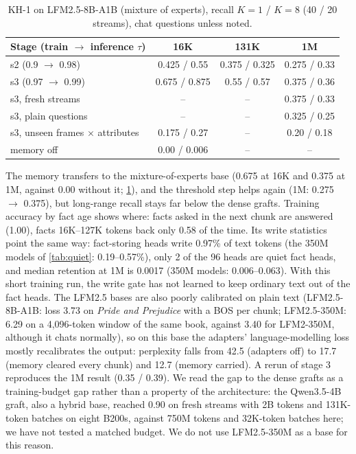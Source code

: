 \documentclass[11pt]{article}
\newcommand{\tauw}{\tau}
\newcommand{\KH}{KH-1}
\begin{document}
\begin{table}[t]
\centering
\small
\caption{\KH{} on LFM2.5-8B-A1B (mixture of experts), recall $K = 1$ / $K = 8$ (40 / 20 streams), chat questions unless noted.}
\label{tab:lfm25}
\begin{tabular}{@{}lccc@{}}
\toprule
Stage (train $\to$ inference $\tauw$) & 16K & 131K & 1M \\
\midrule
s2 (0.9 $\to$ 0.98) & 0.425 / 0.55 & 0.375 / 0.325 & 0.275 / 0.33 \\
s3 (0.97 $\to$ 0.99) & 0.675 / 0.875 & 0.55 / 0.57 & 0.375 / 0.36 \\
s3, fresh streams & -- & -- & 0.375 / 0.33 \\
s3, plain questions & -- & -- & 0.325 / 0.25 \\
s3, unseen frames $\times$ attributes & 0.175 / 0.27 & -- & 0.20 / 0.18 \\
memory off & 0.00 / 0.006 & -- & -- \\
\bottomrule
\end{tabular}
\end{table}

The memory transfers to the mixture-of-experts base (0.675 at 16K and 0.375 at 1M, against 0.00 without it; \cref{tab:lfm25}), and the threshold step helps again (1M: 0.275 $\to$ 0.375), but long-range recall stays far below the dense grafts. Training accuracy by fact age shows where: facts asked in the next chunk are answered (1.00), facts 16K--127K tokens back only 0.58 of the time. Its write statistics point the same way: fact-storing heads write 0.97\% of text tokens (the 350M models of \cref{tab:quiet}: 0.19--0.57\%), only 2 of the 96 heads are quiet fact heads, and median retention at 1M is 0.0017 (350M models: 0.006--0.063). With this short training run, the write gate has not learned to keep ordinary text out of the fact heads. The LFM2.5 bases are also poorly calibrated on plain text (LFM2.5-8B-A1B: loss 3.73 on \emph{Pride and Prejudice} with a BOS per chunk; LFM2.5-350M: 6.29 on a 4{,}096-token window of the same book, against 3.40 for LFM2-350M, although it chats normally), so on this base the adapters' language-modelling loss mostly recalibrates the output: perplexity falls from 42.5 (adapters off) to 17.7 (memory cleared every chunk) and 12.7 (memory carried). A rerun of stage 3 reproduces the 1M result (0.35 / 0.39). We read the gap to the dense grafts as a training-budget gap rather than a property of the architecture: the Qwen3.5-4B graft, also a hybrid base, reached 0.90 on fresh streams with 2B tokens and 131K-token batches on eight B200s, against 750M tokens and 32K-token batches here; we have not tested a matched budget. We do not use LFM2.5-350M as a base for this reason.
\end{document}

